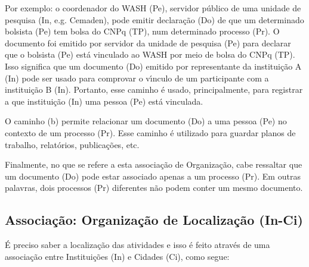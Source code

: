\documentclass[
12pt,		%
openright,	%
twoside,  %
a4paper,			%
chapter=TITLE,		%
english,			%
french,				%
spanish,			%
brazil				%
]{USPSC-classe/USPSC}
\begin{document}
Por exemplo: o coordenador do WASH (Pe), servidor p\'ublico de uma unidade de pesquisa (In, e.g. Cemaden), pode emitir declara\c{c}\~ao (Do) de que um determinado bolsista (Pe) tem bolsa do CNPq (TP), num determinado processo (Pr). O documento foi emitido por servidor da unidade de pesquisa (Pe) para declarar que o bolsista (Pe) est\'a vinculado ao WASH por meio de bolsa do CNPq (TP). Isso significa que um documento (Do) emitido por representante da institui\c{c}\~ao A (In) pode ser usado para comprovar o v\'{\i}nculo de um participante com a institui\c{c}\~ao B (In). Portanto, esse caminho \'e usado, principalmente, para registrar a que institui\c{c}\~ao (In) uma pessoa (Pe) est\'a vinculada.









O caminho (b) permite relacionar um documento (Do) a uma pessoa (Pe) no contexto de um processo (Pr). Esse caminho \'e utilizado para guardar planos de trabalho, relat\'orios, publica\c{c}\~oes, etc.









Finalmente, no que se refere a esta associa\c{c}\~ao de \textquotedbl Organiza\c{c}\~ao\textquotedbl , cabe ressaltar que um documento (Do) pode estar associado apenas a um processo (Pr). Em outras palavras, dois processos (Pr) diferentes n\~ao podem conter um mesmo documento.









\subsection[Associa\c{c}\~ao: Organiza\c{c}\~ao de Localiza\c{c}\~ao (In-Ci)]{Associa\c{c}\~ao: Organiza\c{c}\~ao de Localiza\c{c}\~ao (In-Ci)}\label{Associa\c{c}\~ao: Organiza\c{c}\~ao de Localiza\c{c}\~ao (In-Ci)}
\'E preciso saber a localiza\c{c}\~ao das atividades e isso \'e feito atrav\'es de uma associa\c{c}\~ao entre Institui\c{c}\~oes (In) e Cidades (Ci), como segue:










\end{document}
